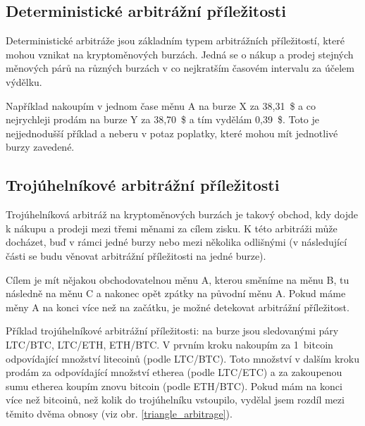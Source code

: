 \documentclass[thesis=B,czech]{FITthesis}[2019/03/21]
\begin{document}
\subsection{Deterministické arbitrážní příležitosti}
Deterministické arbitráže jsou základním typem arbitrážních příležitostí, které mohou vznikat na kryptoměnových burzách. Jedná se o nákup a prodej stejných měnových párů na různých burzách v co nejkratším časovém intervalu za účelem výdělku. \cite{CZInvestor} \cite{TowardsDataScience}

Například nakoupím v jednom čase měnu A na burze X za 38,31~\$ a co nejrychleji prodám na burze Y za 38,70~\$ a tím vydělám 0,39~\$. Toto je nejjednodušší příklad a neberu v potaz poplatky, které mohou mít jednotlivé burzy zavedené. 

\subsection{Trojúhelníkové arbitrážní příležitosti}
Trojúhelníková arbitráž na kryptoměnových burzách je takový obchod, kdy dojde k nákupu a prodeji mezi třemi měnami za cílem zisku. K této arbitráži může docházet, buď v rámci jedné burzy nebo mezi několika odlišnými (v následující části se budu věnovat arbitrážní příležitosti na jedné burze). \cite{TradingStrategy}

Cílem je mít nějakou obchodovatelnou měnu A, kterou směníme na měnu B, tu následně na měnu C a nakonec opět zpátky na původní měnu A. Pokud máme měny A na konci více než na začátku, je možné detekovat arbitrážní příležitost.

Příklad trojúhelníkové arbitrážní příležitosti: na burze jsou sledovanými páry LTC/BTC, LTC/ETH, ETH/BTC. V prvním kroku nakoupím za 1~bitcoin odpovídající množství litecoinů (podle LTC/BTC). Toto množství v dalším kroku prodám za odpovídající množství etherea (podle LTC/ETC) a za zakoupenou sumu etherea koupím znovu bitcoin (podle ETH/BTC). Pokud mám na konci více než bitcoinů, než kolik do trojúhelníku vstoupilo, vydělal jsem rozdíl mezi těmito dvěma obnosy (viz obr. \ref{triangle_arbitrage}).
\end{document}
